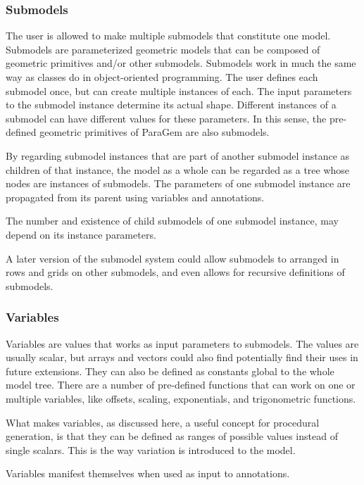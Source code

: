 \documentclass[english]{article}
\begin{document}
\subsubsection{Submodels}

The user is allowed to make multiple submodels that constitute one model. Submodels are parameterized geometric models that can be composed of geometric primitives and/or other submodels. Submodels work in much the same way as classes do in object-oriented programming. The user defines each submodel once, but can create multiple instances of each. The input parameters to the submodel instance determine its actual shape. Different instances of a submodel can have different values for these parameters. In this sense, the pre-defined geometric primitives of ParaGem are also submodels. 

By regarding submodel instances that are part of another submodel instance as children of that instance, the model as a whole can be regarded as a tree whose nodes are instances of submodels. The parameters of one submodel instance are propagated from its parent using variables and annotations.

The number and existence of child submodels of one submodel instance, may depend on its instance parameters.

A later version of the submodel system could allow submodels to arranged in rows and grids on other submodels, and even allows for recursive definitions of submodels.

\subsubsection{Variables}

Variables are values that works as input parameters to submodels. The values are usually scalar, but arrays and vectors could also find potentially find their uses in future extensions. They can also be defined as constants global to the whole model tree. There are a number of pre-defined functions that can work on one or multiple variables, like offsets, scaling, exponentials, and trigonometric functions.

What makes variables, as discussed here, a useful concept for procedural generation, is that they can be defined as ranges of possible values instead of single scalars. This is the way variation is introduced to the model.

Variables manifest themselves when used as input to annotations. 
\end{document}
